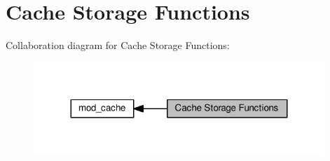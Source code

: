 \hypertarget{group__Cache__storage}{}\section{Cache Storage Functions}
\label{group__Cache__storage}
Collaboration diagram for Cache Storage Functions\+:
\nopagebreak
\begin{figure}[H]
\begin{center}
\leavevmode
\includegraphics[width=311pt]{group__Cache__storage}
\end{center}
\end{figure}

